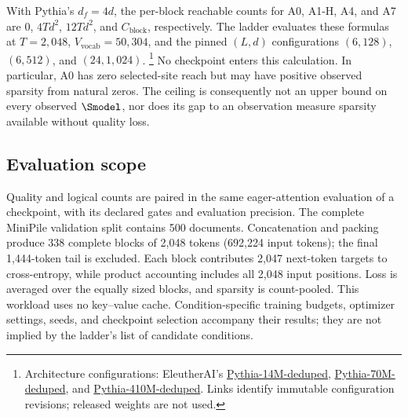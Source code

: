With Pythia's $d_f=4d$, the per-block reachable counts for A0, A1-H, A4, and A7
are $0$, $4Td^2$, $12Td^2$, and $C_{\mathrm{block}}$, respectively. The ladder
evaluates these formulas at $T=2{,}048$, $V_{\!\mathrm{vocab}}=50{,}304$, and
the pinned $(L,d)$ configurations $(6,128)$, $(6,512)$, and $(24,1{,}024)$.%
\footnote{Architecture configurations: EleutherAI's
\href{https://huggingface.co/EleutherAI/pythia-14m-deduped/blob/7386d9a4ae45aef494a6e704910394def3037fc5/config.json}{Pythia-14M-deduped},
\href{https://huggingface.co/EleutherAI/pythia-70m-deduped/blob/e93a9faa9c77e5d09219f6c868bfc7a1bd65593c/config.json}{Pythia-70M-deduped}, and
\href{https://huggingface.co/EleutherAI/pythia-410m-deduped/blob/b5e8535141902c0e985cea61fd02afe7fe86af32/config.json}{Pythia-410M-deduped}.
Links identify immutable configuration revisions; released weights are not used.}
No checkpoint enters this calculation. In particular, A0 has zero selected-site
reach but may have positive observed sparsity from natural zeros. The ceiling
is consequently not an upper bound on every observed $\Smodel$, nor does its
gap to an observation measure sparsity available without quality loss.

\subsection{Evaluation scope}
\label{app:evaluation}

Quality and logical counts are paired in the same eager-attention evaluation
of a checkpoint, with its declared gates and evaluation precision. The complete
MiniPile validation split contains 500 documents. Concatenation and packing
produce 338 complete blocks of 2,048 tokens (692,224 input tokens); the final
1,444-token tail is excluded. Each block contributes 2,047 next-token targets
to cross-entropy, while product accounting includes all 2,048 input positions.
Loss is averaged over the equally sized blocks, and sparsity is count-pooled.
This workload uses no key--value cache. Condition-specific training budgets,
optimizer settings, seeds, and checkpoint selection accompany their results;
they are not implied by the ladder's list of candidate conditions.
